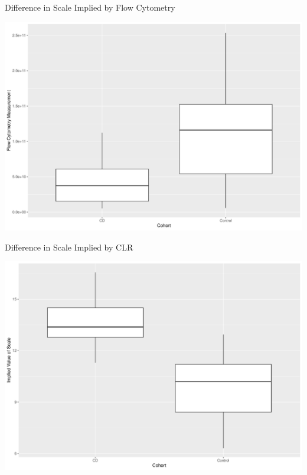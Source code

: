 \documentclass[
  ignorenonframetext,
]{beamer}
\begin{document}
\begin{frame}{Difference in Scale Implied by Flow Cytometry}
\protect\hypertarget{difference-in-scale-implied-by-flow-cytometry}{}
\begin{center}\includegraphics[width=0.95\linewidth]{slides_files/figure-beamer/unnamed-chunk-11-1} \end{center}
\end{frame}

\begin{frame}{Difference in Scale Implied by CLR}
\protect\hypertarget{difference-in-scale-implied-by-clr}{}
\begin{center}\includegraphics[width=0.95\linewidth]{slides_files/figure-beamer/unnamed-chunk-12-1} \end{center}
\end{frame}
\end{document}
